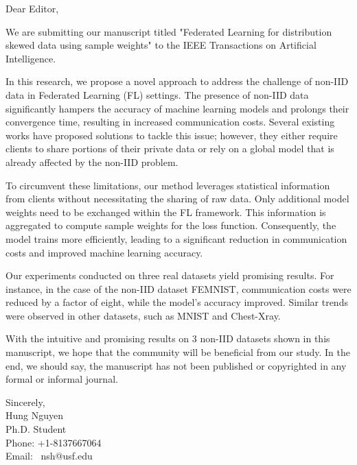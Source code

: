 \documentclass{letter}
\begin{document}
	
	\begin{letter}{}
		\opening{Dear Editor,}
		
We are submitting our manuscript titled "Federated Learning for distribution skewed data using sample weights" to the IEEE Transactions on Artificial Intelligence.

In this research, we propose a novel approach to address the challenge of non-IID data in Federated Learning (FL) settings. The presence of non-IID data significantly hampers the accuracy of machine learning models and prolongs their convergence time, resulting in increased communication costs. Several existing works have proposed solutions to tackle this issue; however, they either require clients to share portions of their private data or rely on a global model that is already affected by the non-IID problem.

To circumvent these limitations, our method leverages statistical information from clients without necessitating the sharing of raw data. Only additional model weights need to be exchanged within the FL framework. This information is aggregated to compute sample weights for the loss function. Consequently, the model trains more efficiently, leading to a significant reduction in communication costs and improved machine learning accuracy.

Our experiments conducted on three real datasets yield promising results. For instance, in the case of the non-IID dataset FEMNIST, communication costs were reduced by a factor of eight, while the model's accuracy improved. Similar trends were observed in other datasets, such as MNIST and Chest-Xray.

With the intuitive and promising results on 3 non-IID datasets shown in this manuscript, we hope that the community will be beneficial from our study. In the end, we should say, the manuscript has not been published or copyrighted in any formal or informal journal.


Sincerely,\\
Hung Nguyen\\
Ph.D. Student\\
Phone: +1-8137667064\\
Email:  nsh@usf.edu\\

\end{letter}
\end{document}

